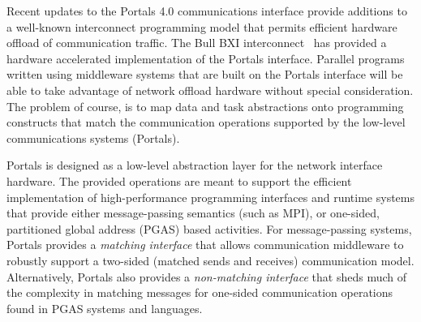 



%



Recent updates to the Portals 4.0 communications interface provide
additions to a well-known interconnect programming model that permits
efficient hardware offload of communication traffic. The Bull\othertm{} BXI\othertm{}
interconnect~\cite{bxi} has provided a hardware accelerated implementation
of the Portals interface.  Parallel programs written using middleware
systems that are built on the Portals interface will be able to take
advantage of network offload hardware without special consideration. 
The problem of course, is to map data and task abstractions onto
programming constructs that match the communication operations
supported by the low-level communications systems (Portals). 

Portals is designed as a low-level abstraction layer for the network
interface hardware. The provided operations are meant to support the
efficient implementation of high-performance programming interfaces
and runtime systems that provide either message-passing semantics
(such as MPI), or one-sided, partitioned global address (PGAS) based
activities. For message-passing systems, Portals provides a {\em
  matching interface} that allows communication middleware to robustly
support a two-sided (matched sends and receives) communication
model. Alternatively, Portals also provides a {\em non-matching
  interface} that sheds much of the complexity in matching messages
for one-sided communication operations found in PGAS systems and
languages.

